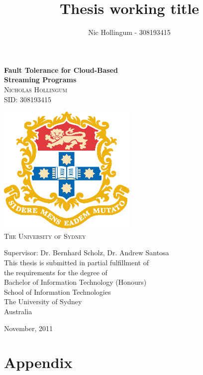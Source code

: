 \documentclass{report}
\author{Nic Hollingum - 308193415}
\title{Thesis working title}
\begin{document}
\addtolength{\headheight}{2.5pt}
\onehalfspace
\pagestyle{fancy}

\newcommand{\HRule}{\rule{\linewidth}{0.5mm}}
\begin{titlepage}
\begin{center}

	{\huge \bfseries Fault Tolerance for Cloud-Based}
	\\[0.3cm]
	{\huge \bfseries Streaming Programs}
	\\[0.6cm]
	
	\textsc{\LARGE 	Nicholas Hollingum	\\
					SID: 308193415		\\[0.6cm]}
	
	\includegraphics[width=0.50\textwidth]{figures/usyd.eps}\\[0.2cm]
  
  \textsc{\LARGE The University of Sydney}\\[0.8cm]
  
  
  \begin{center}
  \large Supervisor: Dr. Bernhard Scholz, Dr. Andrew Santosa\\[0.4cm]

  This thesis is submitted in partial fulfillment of\\
  the requirements for the degree of\\
  Bachelor of Information Technology (Honours)\\[0.5cm]

  \Large School of Information Technologies\\
  The University of Sydney\\
  Australia
  \end{center}
  \vfill
  {\large November, 2011}
\end{center}
\end{titlepage}
\newpage
\newpage




\tableofcontents












\chapter{Appendix}




\end{document}

